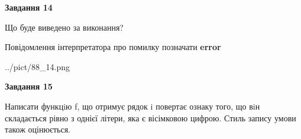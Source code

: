 \documentclass[11pt, ukrainian]{article}
\begin{document}
{\begin {large}
{\begin {center}\textbf{Завдання 14}\end {center}}\par
Що буде виведено за виконання? \par
Повідомлення інтерпретатора про помилку позначати \textbf{error}

\begin{center}
	{../pict/88_14.png}
\end{center}
\newpage

{\begin {center}\textbf{Завдання 15}\end {center}}\par

Написати функцiю f, що отримує рядок i повертає ознаку того, що вiн складається рівно з однієї літери, яка є вісімковою цифрою. Стиль запису умови також оцінюється.\par
\newpage

\end {large}}
\end{document}
